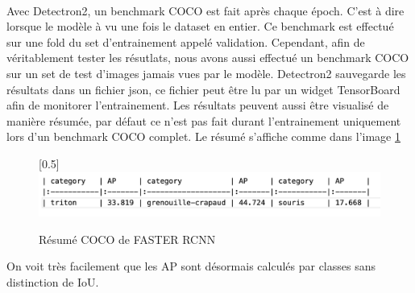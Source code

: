 \paragraph{}
Avec Detectron2, un benchmark COCO est fait après chaque époch. C'est à dire lorsque le modèle à vu une fois le dataset en entier. Ce benchmark est effectué sur une fold du set d'entrainement appelé validation. Cependant, afin de véritablement tester les résutlats, nous avons aussi effectué un benchmark COCO sur un set de test d'images jamais vues par le modèle. 
Detectron2 sauvegarde les résultats dans un fichier json, ce fichier peut être lu par un widget TensorBoard afin de monitorer l'entrainement.
Les résultats peuvent aussi être visualisé de manière résumée, par défaut ce n'est pas fait durant l'entrainement uniquement lors d'un benchmark COCO complet. Le résumé s'affiche comme dans l'image \ref{fig:eval_coco_benchmark_resume} 
\begin{figure}
    \centering
    \scalebox{0.5}[0.5]{\includegraphics[width=\textwidth]{images/eval_coco_benchmark_resume.png}}
    \caption{Résumé COCO de FASTER RCNN}
    \label{fig:eval_coco_benchmark_resume}
\end{figure}
On voit très facilement que les AP sont désormais calculés par classes sans distinction de IoU. 


